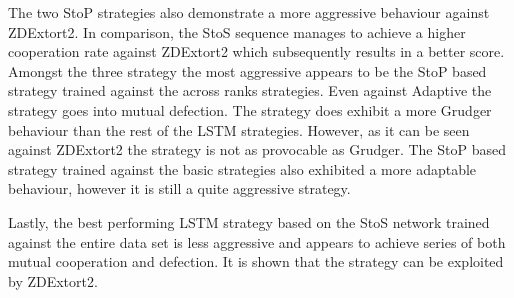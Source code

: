 The two StoP strategies also demonstrate a more aggressive behaviour against
ZDExtort2. In comparison, the StoS sequence manages to achieve a higher cooperation
rate against ZDExtort2 which subsequently results in a better score.
Amongst the three strategy the most aggressive appears to be the StoP based
strategy trained against the across ranks strategies. Even against Adaptive
the strategy goes into mutual defection. The strategy does exhibit a more Grudger
behaviour than the rest of the LSTM strategies. However, as it can be seen
against ZDExtort2 the strategy is not as provocable as Grudger. The StoP based
strategy trained against the basic strategies also exhibited a more adaptable
behaviour, however it is still a quite aggressive strategy.

Lastly, the best performing LSTM strategy based on the StoS network trained
against the entire data set is less aggressive and appears to achieve series of
both mutual cooperation and defection. It is shown that the strategy can be
exploited by ZDExtort2.


